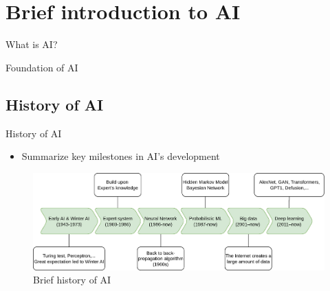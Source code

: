 \section{Brief introduction to AI}

\begin{frame}{What is AI?}
\end{frame}

\begin{frame}{Foundation of AI}
\end{frame}

\subsection{History of AI}

\begin{frame}{History of AI}
    \begin{itemize}
        \item Summarize key milestones in AI's development
    \end{itemize}

    \begin{figure}
        \centering
        \includegraphics[width=\linewidth]{img/history_ai.png}
        \caption{Brief history of AI}
    \end{figure}
\end{frame}

